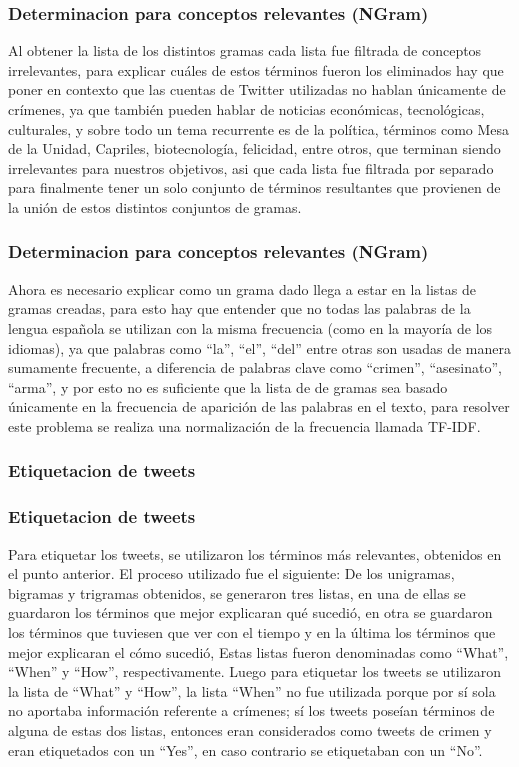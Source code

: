 \documentclass{beamer}
\newcommand\Fontvi{\fontsize{10}{7.2}\selectfont}
\begin{document}
\begin{frame}
\frametitle{Determinacion para conceptos relevantes (NGram)}
Al obtener la lista de los distintos gramas cada lista fue filtrada de conceptos irrelevantes, para explicar cu\'{a}les de estos t\'{e}rminos fueron los eliminados hay que poner en contexto que las cuentas de Twitter utilizadas no hablan únicamente de cr\'{i}menes, ya que tambi\'{e}n pueden hablar de noticias econ\'{o}micas, tecnol\'{o}gicas, culturales, y sobre todo un tema recurrente es de la pol\'{i}tica, t\'{e}rminos como Mesa de la Unidad, Capriles, biotecnolog\'{i}a, felicidad, entre otros, que terminan siendo irrelevantes para nuestros objetivos, asi que cada lista fue filtrada por separado para finalmente tener un solo conjunto de t\'{e}rminos resultantes que provienen de la uni\'{o}n de estos distintos conjuntos de gramas.
\end{frame}
\begin{frame} 
\frametitle{Determinacion para conceptos relevantes (NGram)}
Ahora es necesario explicar como un grama dado llega a estar en la listas de gramas creadas, para esto hay que entender que no todas las palabras de la lengua espa\~{n}ola se utilizan con la misma frecuencia (como en la mayor\'{i}a de los idiomas), ya que palabras como “la”, “el”, “del” entre otras son usadas de manera sumamente frecuente, a diferencia de palabras clave como “crimen”, “asesinato”, “arma”, y por esto no es suficiente que la lista de de gramas sea basado únicamente en la frecuencia de aparici\'{o}n de las palabras en el texto, para resolver este problema se realiza una normalizaci\'{o}n de la frecuencia llamada TF-IDF.
\end{frame}


\subsubsection{Etiquetacion de tweets}
\begin{frame}
\frametitle{Etiquetacion de tweets}
\Fontvi
Para etiquetar los tweets, se utilizaron los t\'{e}rminos m\'{a}s relevantes, obtenidos en el punto anterior. El proceso utilizado fue el siguiente: De los unigramas, bigramas y trigramas obtenidos, se generaron tres listas, en una de ellas se guardaron los t\'{e}rminos que mejor explicaran qu\'{e} sucedi\'{o}, en otra se guardaron los t\'{e}rminos que tuviesen que ver con el tiempo y en la última los t\'{e}rminos que mejor explicaran el c\'{o}mo sucedi\'{o}, Estas listas fueron denominadas como “What”, “When” y “How”, respectivamente. Luego para etiquetar los tweets se utilizaron la lista de “What” y “How”, la lista “When” no fue utilizada porque por s\'{i} sola no aportaba informaci\'{o}n referente a cr\'{i}menes; s\'{i} los tweets pose\'{i}an t\'{e}rminos de alguna de estas dos listas, entonces eran considerados como tweets de crimen y eran etiquetados con un “Yes”, en caso contrario se etiquetaban con un “No”. 

\end{frame}
\end{document}
